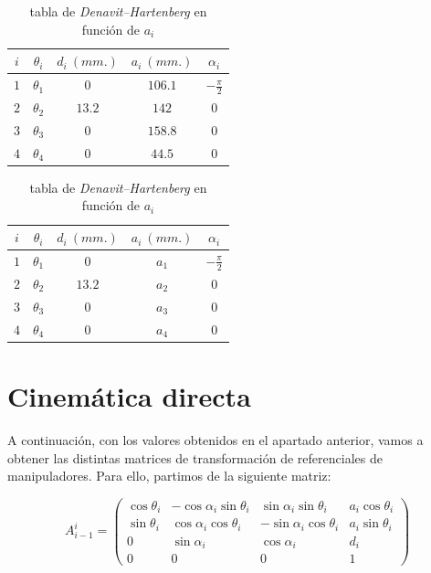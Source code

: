 \documentclass[a4paper,12pt]{article}
\begin{document}
\begin{table}[H]
    \parbox{.45\linewidth}{
        \centering
        \begin{tabular}{ c | c c c c }
            $i$ & $\theta_i$ & $d_i~(mm.)$ & $a_i~(mm.)$ & $\alpha_i$ \\ [0.5ex]
            \hline
            $1$ & $\theta_1$ & $0$ & $106.1$ & $-\frac{\pi}{2}$ \\
            $2$ & $\theta_2$ & $13.2$ & $142$ & $0$ \\
            $3$ & $\theta_3$ & $0$ & $158.8$ & $0$ \\
            $4$ & $\theta_4$ & $0$ & $44.5$ & $0$ \\ [1ex]
        \end{tabular}
        \caption{tabla de \textit{Denavit–Hartenberg}}
    }
    \hfill
    \parbox{.45\linewidth}{
        \centering
        \begin{tabular}{ c | c c c c }
            $i$ & $\theta_i$ & $d_i~(mm.)$ & $a_i~(mm.)$ & $\alpha_i$ \\ [0.5ex]
            \hline
            $1$ & $\theta_1$ & $0$ & $a_1$ & $-\frac{\pi}{2}$ \\
            $2$ & $\theta_2$ & $13.2$ & $a_2$ & $0$ \\
            $3$ & $\theta_3$ & $0$ & $a_3$ & $0$ \\
            $4$ & $\theta_4$ & $0$ & $a_4$ & $0$ \\ [1ex]
        \end{tabular}
        \caption{tabla de \textit{Denavit–Hartenberg} en función de $a_i$}
    }
\end{table}

\section{Cinemática directa}
A continuación, con los valores obtenidos en el apartado anterior, vamos a obtener las
distintas matrices de transformación de referenciales de manipuladores. Para ello, partimos de la
siguiente matriz:

\[
    A_{i-1}^i = 
    \begin{pmatrix}
        \cos\theta_i & -\cos\alpha_i\sin\theta_i & \sin\alpha_i\sin\theta_i & a_i\cos\theta_i \\
        \sin\theta_i & \cos\alpha_i\cos\theta_i & -\sin\alpha_i\cos\theta_i & a_i\sin\theta_i \\
        0 & \sin\alpha_i & \cos\alpha_i & d_i \\
        0 & 0 & 0 & 1
    \end{pmatrix}
\]
\end{document}

